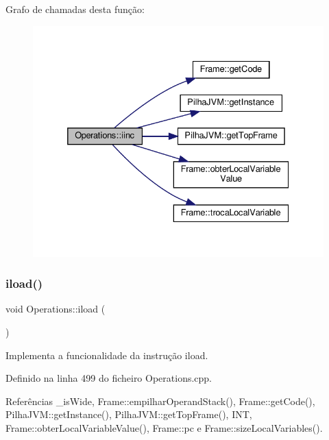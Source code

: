 Grafo de chamadas desta função\+:
\nopagebreak
\begin{figure}[H]
\begin{center}
\leavevmode
\includegraphics[width=332pt]{classOperations_a9934f9369192b10a978c7d6950592c42_cgraph}
\end{center}
\end{figure}
\mbox{\label{classOperations_a84e70afc25fa4e54a7e2bffae742222a}} 
\subsubsection{\texorpdfstring{iload()}{iload()}}
{\footnotesize\ttfamily void Operations\+::iload (\begin{DoxyParamCaption}{ }\end{DoxyParamCaption})\hspace{0.3cm}{\ttfamily [private]}}



Implementa a funcionalidade da instrução iload. 



Definido na linha 499 do ficheiro Operations.\+cpp.



Referências \+\_\+is\+Wide, Frame\+::empilhar\+Operand\+Stack(), Frame\+::get\+Code(), Pilha\+J\+V\+M\+::get\+Instance(), Pilha\+J\+V\+M\+::get\+Top\+Frame(), I\+NT, Frame\+::obter\+Local\+Variable\+Value(), Frame\+::pc e Frame\+::size\+Local\+Variables().



